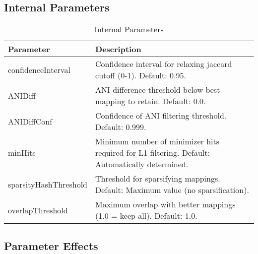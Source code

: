 \documentclass{article}
\begin{document}
\subsection{Internal Parameters}

\begin{table}[htbp]
\centering
\begin{tabular}{@{}lp{10cm}@{}}
\toprule
\textbf{Parameter} & \textbf{Description} \\
\midrule
confidenceInterval & Confidence interval for relaxing jaccard cutoff (0-1). Default: 0.95. \\
\addlinespace
ANIDiff & ANI difference threshold below best mapping to retain. Default: 0.0. \\
\addlinespace
ANIDiffConf & Confidence of ANI filtering threshold. Default: 0.999. \\
\addlinespace
minHits & Minimum number of minimizer hits required for L1 filtering. Default: Automatically determined. \\
\addlinespace
sparsityHashThreshold & Threshold for sparsifying mappings. Default: Maximum value (no sparsification). \\
\addlinespace
overlapThreshold & Maximum overlap with better mappings (1.0 = keep all). Default: 1.0. \\
\bottomrule
\end{tabular}
\caption{Internal Parameters}
\label{tab:internal-params}
\end{table}

\subsection{Parameter Effects}
\end{document}
